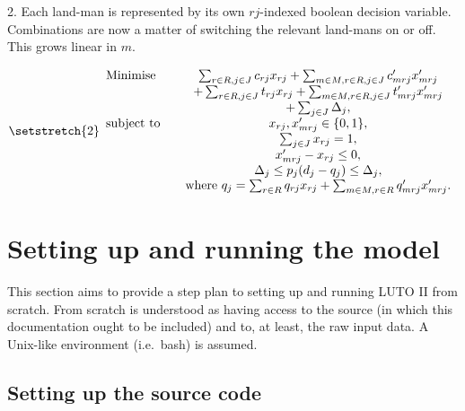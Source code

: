 \documentclass[12pt,a4paper,twoside]{article}
\begin{document}
2. Each land-man is represented by its own $rj$-indexed boolean decision variable. Combinations are now a matter of switching the relevant land-mans on or off. This grows linear in $m$.

\everymath{\displaystyle}
\begin{equation}
	{\setstretch{2}
	\begin{array}{l c}
	\text{Minimise} \quad &
	                  \sum_{r \in R, j \in J} c_{rj} x_{rj}
				    + \sum_{m \in M, r \in R, j \in J} c'_{mrj} x'_{mrj}
					\\
					\quad &
					+ \sum_{r \in R, j \in J} t_{rj} x_{rj}
					+ \sum_{m \in M, r \in R, j \in J} t'_{mrj} x'_{mrj}
					\\
					\quad &
					+ \sum_{j \in J} \Delta_j, \\

	\text{subject to} \quad
	& x_{rj}, x'_{mrj} \in \{0, 1\}, \\
	& \sum_{j \in J} x_{rj}  = 1, \\
	& x'_{mrj} - x_{rj} \leq 0, \\
	& \Delta_j \leq p_j (d_j - q_j) \leq \Delta_j, \\
	& \text{where } q_j = \sum_{r \in R} q_{rj} x_{rj}
	                    + \sum_{m \in M, r \in R} q'_{mrj} x'_{mrj}.
	\end{array}}
\end{equation}
\everymath{}

\section{Setting up and running the model}\label{sec:running}

This section aims to provide a step plan to setting up and running LUTO II from scratch. From scratch is understood as having access to the source (in which this documentation ought to be included) and to, at least, the raw input data. A Unix-like environment (i.e.\ bash) is assumed.

\subsection{Setting up the source code}
\end{document}
